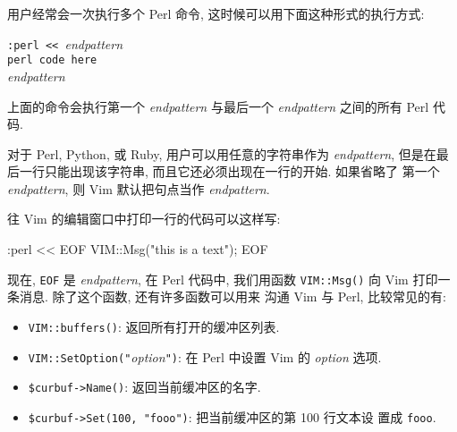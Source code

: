 用户经常会一次执行多个 Perl 命令, 这时候可以用下面这种形式的执行方式:
\begin{vimcmdform}
\texttt{:perl << }\textit{endpattern} \\
\texttt{perl code here} \\
\textit{endpattern}
\end{vimcmdform}
上面的命令会执行第一个 \textit{endpattern} 与最后一个 \textit{endpattern}
之间的所有 Perl 代码.

\begin{warning}
	对于 Perl, Python, 或 Ruby, 用户可以用任意的字符串作为 \textit{endpattern},
	但是在最后一行只能出现该字符串, 而且它还必须出现在一行的开始. 如果省略了
	第一个 \textit{endpattern}, 则 Vim 默认把句点当作 \textit{endpattern}.
\end{warning}

往 Vim 的编辑窗口中打印一行的代码可以这样写:
\begin{vimcode}
:perl << EOF
	VIM::Msg("this is a text");
EOF
\end{vimcode}
现在, \texttt{EOF} 是 \textit{endpattern}, 在 Perl 代码中, 我们用函数
\texttt{VIM::Msg()} 向 Vim 打印一条消息. 除了这个函数, 还有许多函数可以用来
沟通 Vim 与 Perl, 比较常见的有:
\begin{itemize}
	\item \texttt{VIM::buffers()}: 返回所有打开的缓冲区列表.
	\item \texttt{VIM::SetOption("}\textit{option}\texttt{")}: 在 Perl 中设置
		Vim 的 \textit{option} 选项.
	\item \texttt{\$curbuf->Name()}: 返回当前缓冲区的名字.
	\item \texttt{\$curbuf->Set(100, "fooo")}: 把当前缓冲区的第 100 行文本设
		置成 \texttt{fooo}.
\end{itemize}
